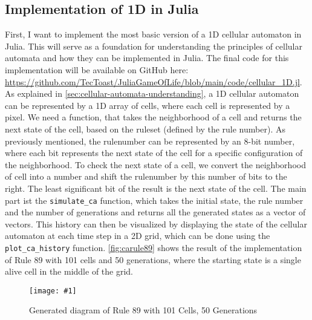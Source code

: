 \documentclass[a4paper,12pt]{llncs}
\numberwithin{equation}{section}
\newcommand{\imagewithwidth}[5]{
  \begin{figure}[htbp]%
    \begin{center}%
      \texttt{[image: \#1]}%
      \caption[#5]{#4}%
      \label{#3}%
    \end{center}%
  \end{figure}
}
\begin{document}
\subsection{Implementation of 1D in Julia}
First, I want to implement the most basic version of a 1D cellular automaton in Julia.
This will serve as a foundation for understanding the principles of cellular automata and how they can be implemented in Julia.
The final code for this implementation will be available on GitHub here: \url{https://github.com/TecToast/JuliaGameOfLife/blob/main/code/cellular_1D.jl}.
As explained in \autoref{sec:cellular-automata-understanding}, a 1D cellular automaton can be represented by a 1D array of cells, where each cell is represented by a pixel.
We need a function, that takes the neighborhood of a cell and returns the next state of the cell, based on the ruleset (defined by the rule number).
As previously mentioned, the rulenumber can be represented by an 8-bit number, where each bit represents the next state of the cell for a specific configuration of the neighborhood.
To check the next state of a cell, we convert the neighborhood of cell into a number and shift the rulenumber by this number of bits to the right. The least significant bit of the result is the next state of the cell.
The main part ist the \texttt{simulate\_ca} function, which takes the initial state, the rule number and the number of generations and returns all the generated states as a vector of vectors.
This history can then be visualized by displaying the state of the cellular automaton at each time step in a 2D grid, which can be done using the \texttt{plot\_ca\_history} function.
\autoref{fig:carule89} shows the result of the implementation of Rule 89 with 101 cells and 50 generations, where the starting state is a single alive cell in the middle of the grid.
\imagewithwidth{figures/carule89}{0.9\textwidth}{fig:carule89}{Generated diagram of Rule 89 with 101 Cells, 50 Generations}{}
\end{document}
